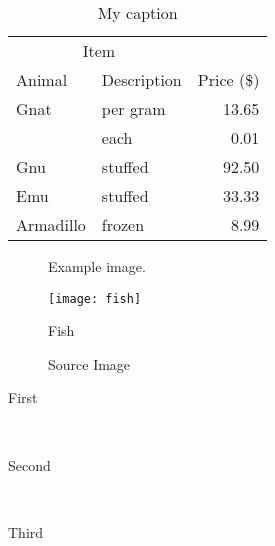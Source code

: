 \begin{table}[H]
	\centering
	\begin{tabular}{@{}llr@{}}
		\toprule
		\toprule
		\multicolumn{2}{c}{Item} &            \\ \cmidrule(r){1-2}
		Animal     & Description & Price (\$) \\ \midrule \midrule
		Gnat       & per gram    & 13.65      \\
		& each        & 0.01       \\
		Gnu        & stuffed     & 92.50      \\
		Emu        & stuffed     & 33.33      \\
		Armadillo  & frozen      & 8.99       \\ \bottomrule
	\end{tabular}
	\caption{My caption}
	\label{my-label}
\end{table}

\begin{figure}[H] %
	\caption{Example image.}
	\label{fig:speciation}
\end{figure}

\lipsum[6] %
\begin{wrapfigure}{l}{0.4\textwidth} %
	\begin{center}
		\texttt{[image: fish]}
	\end{center}
	\caption{Fish}
\end{wrapfigure}
\lipsum[7-8] %

\begin{figure}[H]
	\centering
	\caption{Source Image}
\end{figure}

\begin{description} %
	
	\item[First] \hfill \\
	\lipsum[9] %
	
	\item[Second] \hfill \\
	\lipsum[10] %
	
	\item[Third] \hfill \\
	\lipsum[11] %
	
\end{description} 


